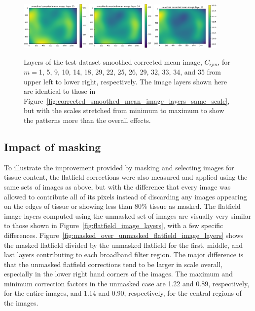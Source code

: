 \documentclass[letterpaper,11pt]{article}
\newcommand{\reffig}[1]{Figure~\ref{#1}}
\begin{document}
\begin{figure}[!ht]
\includegraphics[width=0.3\textwidth]{images/results/smoothed_corrected_mean_image_layers/smoothed_corrected_mean_image_layer_33}
\includegraphics[width=0.3\textwidth]{images/results/smoothed_corrected_mean_image_layers/smoothed_corrected_mean_image_layer_34}
\includegraphics[width=0.3\textwidth]{images/results/smoothed_corrected_mean_image_layers/smoothed_corrected_mean_image_layer_35}
\caption{\footnotesize Layers of the test dataset smoothed corrected mean image, $C_{ijm}$, for $m=$1, 5, 9, 10, 14, 18, 29, 22, 25, 26, 29, 32, 33, 34, and 35 from upper left to lower right, respectively. The image layers shown here are identical to those in \reffig{fig:corrected_smoothed_mean_image_layers_same_scale}, but with the scales stretched from minimum to maximum to show the patterns more than the overall effects.}
\label{fig:corrected_smoothed_mean_image_layers}
\end{figure}

\subsection{Impact of masking}
\label{ssec:impact_of_masking}

To illustrate the improvement provided by masking and selecting images for tissue content, the flatfield corrections were also measured and applied using the same sets of images as above, but with the difference that every image was allowed to contribute all of its pixels instead of discarding any images appearing on the edges of tissue or showing less than 80\% tissue as masked. The flatfield image layers computed using the unmasked set of images are visually very similar to those shown in \reffig{fig:flatfield_image_layers}, with a few specific differences. \reffig{fig:masked_over_unmasked_flatfield_image_layers} shows the masked flatfield divided by the unmasked flatfield for the first, middle, and last layers contributing to each broadband filter region. The major difference is that the unmasked flatfield corrections tend to be larger in scale overall, especially in the lower right hand corners of the images. The maximum and minimum correction factors in the unmasked case are 1.22 and 0.89, respectively, for the entire images, and 1.14 and 0.90, respectively, for the central regions of the images.
\end{document}
